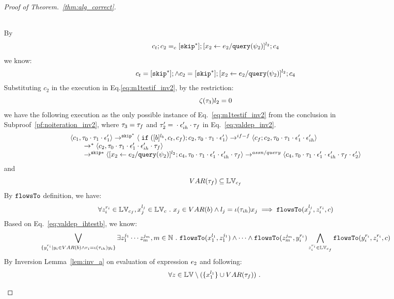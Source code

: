 \begin{proof}[Proof of Theorem.~\ref{thm:alg_correct}]
\begin{case}
\begin{subcase}
\begin{subsubcase}
\begin{subsubsubcase}
\begin{subproof}
\begin{enumerate}
\begin{enumerate}
 \\
 By
 \[
  c_t;c_2 =_c [\mathtt{skip}^*]; [\mathrel{ {x}_2 \leftarrow e_2 / {\tt query}(\psi_2) }]^{l_2};{c}_4
\]
we know:
\[
  c_t = [\mathtt{skip}^*]; \land c_2 = [\mathtt{skip}^*]; [\mathrel{ {x}_2 \leftarrow e_2 / {\tt query}(\psi_2) }]^{l_2};{c}_4
\]
Substituting $c_2$ in the execution in Eq.\ref{eq:m1testif_inv2}, by the restriction:
\[
  \mathtt{\zeta}(\mathtt{\tau}_3)l_2 = 0
\]
we have the following execution as the only possible instance of Eq.~\ref{eq:m1testif_inv2} from the conclusion in Subproof~\ref{pf:noiteration_inv2}, where $\mathtt{\tau}_3 = \mathtt{\tau}_f$ 
and $\mathtt{\tau}_2' = {} \cdot {} \mathtt{\epsilon}_{ih}' \cdot \mathtt{\tau}_f$ in Eq.~\ref{eq:valdep_inv2}.
\[
    \begin{array}{l}   
  \langle c_1, \mathtt{\tau}_0 \cdot \mathtt{\tau}_1 \cdot \mathtt{\epsilon}_1' \rangle 
  \rightarrow^{\mathtt{skip}^*} 
  \langle \;\mathtt{if}\; ([b]^{l_b}, c_t, c_f); {c}_2, \mathtt{\tau}_0 \cdot \mathtt{\tau}_1 \cdot \mathtt{\epsilon}_1' \rangle 
  \rightarrow^{if-f} 
  \langle c_f;c_2, \mathtt{\tau}_0 \cdot \mathtt{\tau}_1 \cdot \mathtt{\epsilon}_1' \cdot \mathtt{\epsilon}_{ih}' \rangle 
  \\
  \qquad \rightarrow^{*} 
  \langle c_2, 
  \mathtt{\tau}_0 \cdot \mathtt{\tau}_1 \cdot \mathtt{\epsilon}_1' \cdot \mathtt{\epsilon}_{ih}' \cdot \mathtt{\tau}_f \rangle
  \\
  \qquad \rightarrow^{\mathtt{skip}*} 
  \langle [\mathrel{ {x}_2 \leftarrow e_2 / {\tt query}(\psi_2) }]^{l_2};{c}_4, 
  \mathtt{\tau}_0 \cdot \mathtt{\tau}_1 \cdot \mathtt{\epsilon}_1' \cdot \mathtt{\epsilon}_{ih}' \cdot \mathtt{\tau}_f \rangle
  \rightarrow^{assn/query} 
  \langle {c}_4,  \mathtt{\tau}_0 \cdot \mathtt{\tau}_1 \cdot \mathtt{\epsilon}_1' \cdot \mathtt{\epsilon}_{ih}' \cdot \mathtt{\tau}_f \cdot \mathtt{\epsilon}_2' \rangle 
\end{array}
\]
and 
\[
  VAR{(\mathtt{\tau}_f)} \subseteq \mathbb{LV}_{c_f}
\]
%
By $\mathtt{flowsTo}$ definition, we have:
\[
  \forall z_i^{r_i} \in \mathbb{LV}_{c_f},  x_j^{l_j} \in \mathbb{LV}_c ~.~ x_j \in VAR(b) \land l_j = \iota(\mathtt{\tau}_{ih}) x_j \implies
  \mathtt{flowsTo}(x_j^{l_j}, z_i^{r_i}, c)
\]
%
Based on Eq.~\ref{eq:valdep_ihtestb}, we know:
%
\[
  \bigvee_{\{y_i^{r_i} \vert y_i \in VAR(b) \land r_i = \iota(\mathtt{\tau}_{ih}) y_i\}}
  \exists z_1^{j_1} \cdots z_m^{j_m}, m \in \mathbb{N} ~.~ 
  \mathtt{flowsTo}(x_1^{l_1}, z_1^{j_1}) \land \cdots \land  \mathtt{flowsTo}(z_m^{j_m}, y_i^{r_i})
  \bigwedge_{z_i^{r_i} \in \mathbb{LV}_{c_f}}
    \mathtt{flowsTo}(y_i^{r_i}, z_i^{r_i}, c) 
\]
%
By Inversion Lemma~\ref{lem:inv_a} on evaluation of expression $e_2$ and following: 
\[
  \forall z \in \mathbb{LV} \setminus (\{x_1^{l_1}\} \cup VAR{(\mathtt{\tau}_f)}) ~.~
\]
\end{enumerate}
\end{enumerate}
\end{subproof}
\end{subsubsubcase}
\end{subsubcase}
\end{subcase}
\end{case}
\end{proof}
